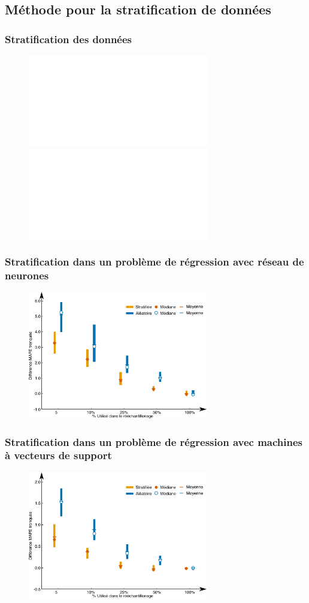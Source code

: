 \documentclass[french]{beamer}
\begin{document}
{\subsection{Méthode pour la stratification de données}
\begin{frame}
\frametitle{Stratification des données} 
\begin{figure}
\begin{center}
\includegraphics<1>[width=0.9\linewidth]{figClusteringTrainingFr_222_summer1.pdf}
\includegraphics<2>[width=0.9\linewidth]{figStratEstimFr_222_summer1.pdf}
\end{center}
\end{figure}
\end{frame}
% 
\begin{frame}
\frametitle{Stratification dans un problème de régression avec réseau de neurones} 
\begin{figure}
\begin{center}
\includegraphics[width=0.7\textwidth]{figDiff_ANN_Inp_state_year_2003.pdf}
\end{center}
\end{figure}
\end{frame}

\begin{frame}
\frametitle{Stratification dans un problème de régression avec machines à vecteurs de support} 
\begin{figure}
\begin{center}
\includegraphics[width=0.7\textwidth]{figDiff_SVR_Inp_state_year_2003.pdf}
\end{center}
\end{figure}
\end{frame}
% 


}
\end{document}
